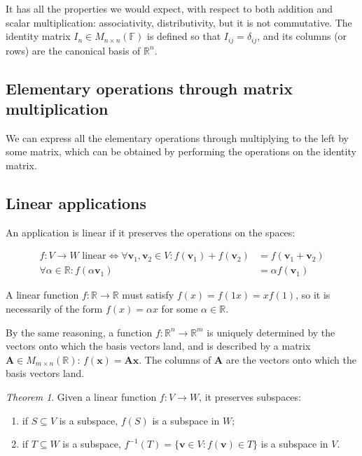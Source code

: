 \documentclass[12pt,a4paper]{report}
\numberwithin{equation}{section}
\theoremstyle{definition}
\theoremstyle{remark}
\newtheorem{theorem}{Theorem}[section]
\begin{document}
It has all the properties we would expect, with respect to both addition and scalar multiplication: associativity, distributivity, but it is not commutative. The identity matrix $I_n \in M_{n\times n}(\mathbb{F})$ is defined so that $I_{ij} = \delta_{ij}$, and its columns (or rows) are the canonical basis of $\mathbb{R}^n$.

\subsection{Elementary operations through matrix multiplication}

We can express all the elementary operations through multiplying to the left by some matrix, which can be obtained by performing the operations on the identity matrix.

\subsection{Linear applications}

An application is linear if it preserves the operations on the spaces:

\begin{align}
f: V\rightarrow W \text{ linear} \iff \forall \mathbf{v}_1, \mathbf{v}_2 \in V: f(\mathbf{v}_1) + f(\mathbf{v}_2) &= f(\mathbf{v}_1 + \mathbf{v}_2) \\
\forall \alpha \in \mathbb{R}: f(\alpha \mathbf{v}_1) &= \alpha f(\mathbf{v}_1)
\end{align}

A linear function $f: \mathbb{R}\rightarrow \mathbb{R}$ must satisfy $f(x) = f( 1x) = x f(1)$, so it is necessarily of the form $f(x) = \alpha x$ for some $\alpha\in\mathbb{R}$.

By the same reasoning, a function $f: \mathbb{R}^n\rightarrow \mathbb{R}^m$ is uniquely determined by the vectors onto which the basis vectors land, and is described by a matrix $\mathbf{A} \in M_{m\times n}(\mathbb{R})$: $f(\mathbf{x}) = \mathbf{Ax}$. The columns of $\mathbf{A}$ are the vectors onto which the basis vectors land.

\begin{theorem}
Given a linear function $f: V \rightarrow W$, it preserves subspaces:
\begin{enumerate}
\item if $S\subseteq V$ is a subspace, $f(S)$ is a subspace in $W$;
\item if $T\subseteq W$ is a subspace, $f^{-1} (T) = \lbrace \mathbf{v} \in V: f(\mathbf{v}) \in T\rbrace$ is a subspace in $V$.
\end{enumerate}
\end{theorem}
\end{document}
